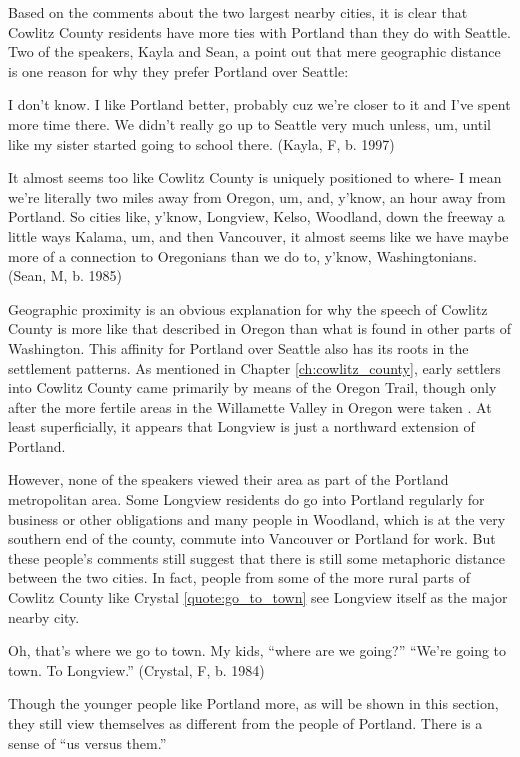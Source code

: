 Based on the comments about the two largest nearby cities, it is clear that Cowlitz County residents have more ties with Portland than they do with Seattle. Two of the speakers, Kayla and Sean, a point out that mere geographic distance is one reason for why they prefer Portland over Seattle:
\begin{num_quote}
    I don't know. I like Portland better, probably cuz we're closer to it and I've spent more time there. We didn't really go up to Seattle very much unless, um, until like my sister started going to school there. (Kayla, F, b. 1997)
    \label{quote:i_like_portland_better}
\end{num_quote}
\begin{num_quote}
    It almost seems too like Cowlitz County is uniquely positioned to where- I mean we're literally two miles away from Oregon, um, and, y'know, an hour away from Portland. So cities like, y'know, Longview, Kelso, Woodland, down the freeway a little ways Kalama, um, and then Vancouver, it almost seems like we have maybe more of a connection to Oregonians than we do to, y'know, Washingtonians. (Sean, M, b. 1985)
    \label{quote:connection_to_oregonians}
\end{num_quote}
Geographic proximity is an obvious explanation for why the speech of Cowlitz County is more like that described in Oregon than what is found in other parts of Washington. This affinity for Portland over Seattle also has its roots in the settlement patterns. As mentioned in Chapter \ref{ch:cowlitz_county}, early settlers into Cowlitz County came primarily by means of the Oregon Trail, though only after the more fertile areas in the Willamette Valley in Oregon were taken \citep[37]{urrutia_1998}. At least superficially, it appears that Longview is just a northward extension of Portland.

However, none of the speakers viewed their area as part of the Portland metropolitan area. Some Longview residents do go into Portland regularly for business or other obligations and many people in Woodland, which is at the very southern end of the county, commute into Vancouver or Portland for work. But these people's comments still suggest that there is still some metaphoric distance between the two cities. In fact, people from some of the more rural parts of Cowlitz County like Crystal \ref{quote:go_to_town} see Longview itself as the major nearby city.
\begin{num_quote}
    Oh, that's where we go to town. My kids, ``where are we going?'' ``We're going to town. To Longview.'' (Crystal, F, b. 1984)
    \label{quote:go_to_town}
\end{num_quote}
Though the younger people like Portland more, as will be shown in this section, they still view themselves as different from the people of Portland. There is a sense of ``us versus them.''


